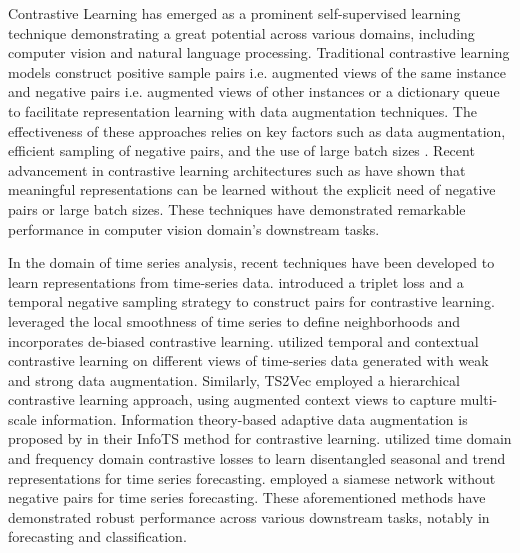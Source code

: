 



Contrastive Learning has emerged as a prominent self-supervised learning technique demonstrating a great potential across various domains, including computer vision and natural language processing. Traditional contrastive learning models \cite{Caron2020UnsupervisedLO, chen2020simple, He2019MomentumCF} construct positive sample pairs i.e. augmented views of the same instance and negative pairs i.e. augmented views of other instances or a dictionary queue to facilitate representation learning with data augmentation techniques. The effectiveness of these approaches relies on key factors such as data augmentation, efficient sampling of negative pairs, and the use of large batch sizes \cite{chen2020simple}. Recent advancement in contrastive learning architectures such as \cite{Chen2020ExploringSS, grill2020bootstrap} have shown that meaningful representations can be learned without the explicit need of negative pairs or large batch sizes. These techniques have demonstrated remarkable performance in computer vision domain's downstream tasks.

In the domain of time series analysis, recent techniques have been developed to learn representations from time-series data. \cite{franceschi2019unsupervised} introduced a triplet loss and a temporal negative sampling strategy to construct pairs for contrastive learning. \cite{tonekaboni2021unsupervised} leveraged the local smoothness of time series to define neighborhoods and incorporates de-biased contrastive learning. \cite{Eldele2021TimeSeriesRL} utilized temporal and contextual contrastive learning on different views of time-series data generated with weak and strong data augmentation. Similarly, TS2Vec \cite{Yue2021TS2VecTU} employed a hierarchical contrastive learning approach, using augmented context views to capture multi-scale information. Information theory-based adaptive data augmentation is proposed by \cite{Luo2023TimeSC} in their InfoTS method for contrastive learning. \cite{woo2022cost} utilized time domain and frequency domain contrastive losses to learn disentangled seasonal and trend representations for time series forecasting. \cite{Zheng2023SimTSRC} employed a siamese network without negative pairs for time series forecasting. These aforementioned methods have demonstrated robust performance across various downstream tasks, notably in forecasting and classification.

